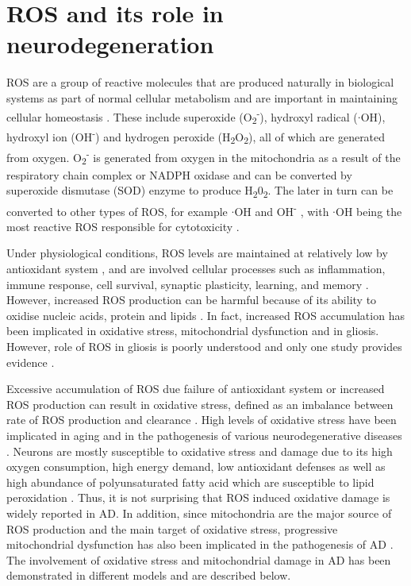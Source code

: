 \section{ROS and its role in neurodegeneration}
ROS are a group of reactive molecules that are produced naturally in biological systems as part of normal cellular metabolism and are important in maintaining cellular homeostasis \citep{Cenini2019}. These include superoxide (O\textsubscript{2}\textsuperscript{-}), hydroxyl radical ($\cdot$OH), hydroxyl ion (OH\textsuperscript{-}) and hydrogen peroxide (H\textsubscript{2}O\textsubscript{2}), all of which are generated from oxygen. O\textsubscript{2}\textsuperscript{-} is generated from oxygen in the mitochondria as a result of the respiratory chain complex or NADPH oxidase and can be converted by superoxide dismutase (SOD) enzyme to produce H\textsubscript{2}0\textsubscript{2}. The later  in turn can be converted to other types of ROS, for example $\cdot$OH and OH\textsuperscript{-} \citep{Kim2015a}, with $\cdot$OH being the most reactive ROS responsible for cytotoxicity \citep{Bolisetty2013}.

Under physiological conditions, ROS levels are maintained at relatively low by antioxidant system \citep{Dasuri2013,Gandhi2012}, and are involved cellular processes such as inflammation, immune response, cell survival, synaptic plasticity, learning, and memory \citep{Cenini2019,Kishida2007,Liu2017}. However, increased ROS production can be harmful because of its ability to oxidise nucleic acids, protein and lipids \citep{Wang2014}. In fact, increased ROS accumulation has been implicated in oxidative stress, mitochondrial dysfunction and in gliosis. However, role of ROS in gliosis is poorly understood and only one study provides evidence \citep{Kishida2007}.

Excessive accumulation of ROS due failure of antioxidant system or increased ROS production can result in oxidative stress, defined as an imbalance between rate of ROS production and clearance \citep{Wang2014}. High levels of oxidative stress have been implicated in aging and in the pathogenesis of various neurodegenerative diseases \citep{Bonda2010,Cenini2019,Liu2017,Shibata2008}. Neurons are mostly susceptible to oxidative stress and damage due to its high oxygen consumption, high energy demand, low antioxidant defenses as well as high abundance of polyunsaturated fatty acid which are susceptible to lipid peroxidation \citep{Cobley2018}. Thus, it is not surprising that ROS induced oxidative damage is widely reported in AD. In addition, since mitochondria are the major source of ROS production and the main target of oxidative stress, progressive mitochondrial dysfunction has also been implicated in the pathogenesis of AD \citep{Swerdlow2007}. The involvement of oxidative stress and mitochondrial damage in AD has been demonstrated in different models and are described below. 

